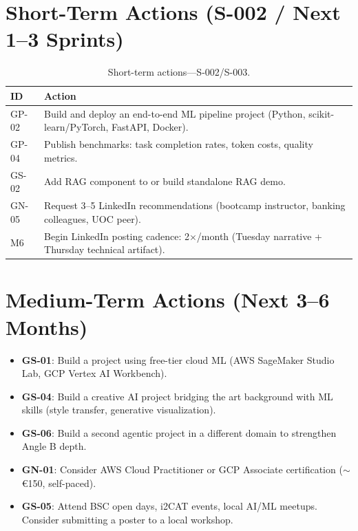 \documentclass[a4paper,11pt,openany]{report}
\begin{document}
\section{Short-Term Actions (S-002 / Next 1--3 Sprints)}

\begin{table}[htbp]
\centering
\caption{Short-term actions---S-002/S-003.}
\label{tab:actions-short}
\small
\begin{tabularx}{\textwidth}{l X}
\toprule
\textbf{ID} & \textbf{Action} \\
\midrule
GP-02 & Build and deploy an end-to-end ML pipeline project (Python, scikit-learn/PyTorch, FastAPI, Docker). \\
GP-04 & Publish \projectName{} benchmarks: task completion rates, token costs, quality metrics. \\
GS-02 & Add RAG component to \projectName{} or build standalone RAG demo. \\
GN-05 & Request 3--5 LinkedIn recommendations (bootcamp instructor, banking colleagues, UOC peer). \\
M6    & Begin LinkedIn posting cadence: 2$\times$/month (Tuesday narrative + Thursday technical artifact). \\
\bottomrule
\end{tabularx}
\end{table}

\section{Medium-Term Actions (Next 3--6 Months)}

\begin{itemize}
  \item \textbf{GS-01}: Build a project using free-tier cloud ML (AWS
    SageMaker Studio Lab, GCP Vertex AI Workbench).
  \item \textbf{GS-04}: Build a creative AI project bridging the art
    background with ML skills (style transfer, generative visualization).
  \item \textbf{GS-06}: Build a second agentic project in a different domain
    to strengthen Angle B depth.
  \item \textbf{GN-01}: Consider AWS Cloud Practitioner or GCP Associate
    certification ($\sim$€150, self-paced).
  \item \textbf{GS-05}: Attend BSC open days, i2CAT events, local AI/ML
    meetups. Consider submitting a poster to a local workshop.
\end{itemize}
\end{document}

